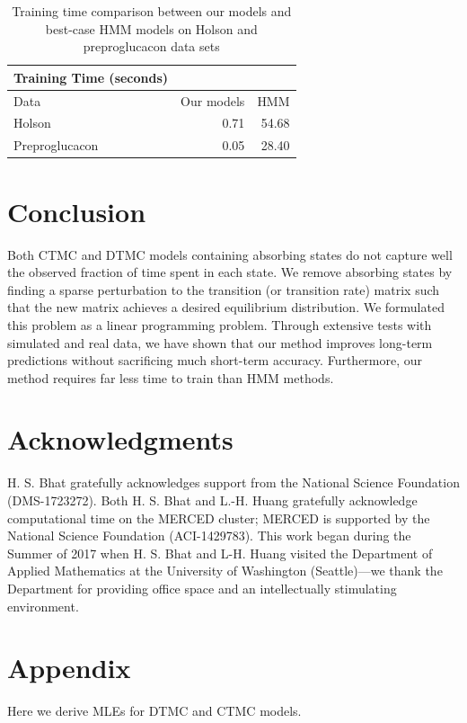 \documentclass[review,letterpaper,11pt]{elsarticle}
\begin{document}
\begin{table}[tbh]
\centering
\begin{tabular}{lrr}
{\bf Training Time (seconds)} & & \\
\toprule
          Data &  Our models &   HMM \\
\midrule
        Holson &       0.71 &  54.68 \\
Preproglucacon &       0.05 &  28.40 \\
\bottomrule
\end{tabular}
\caption{Training time comparison between our models and best-case HMM models on Holson and preproglucacon data sets}
\label{tab:trainingtimes}
\end{table}

\section{Conclusion}
\label{sect:conclusion}
Both CTMC and DTMC models containing absorbing states do not capture well the observed fraction of time spent in each state.  We remove absorbing states by finding a sparse perturbation to the transition (or transition rate) matrix such that the new matrix achieves a desired equilibrium distribution. We formulated this problem as a linear programming problem.  Through extensive tests with simulated and real data, we have shown that our method improves long-term predictions without sacrificing much short-term accuracy.  Furthermore, our method requires far less time to train than HMM methods.

\section*{Acknowledgments}
H. S. Bhat gratefully acknowledges support from the National Science Foundation (DMS-1723272).  Both H. S. Bhat and L.-H. Huang gratefully acknowledge computational time on the MERCED cluster; MERCED is supported by the National Science Foundation (ACI-1429783).  This work began during the Summer of 2017 when H. S. Bhat and L-H. Huang visited the Department of Applied Mathematics at the University of Washington (Seattle)---we thank the Department for providing office space and an intellectually stimulating environment.

\section*{Appendix}
Here we derive MLEs for DTMC and CTMC models.
\end{document}
